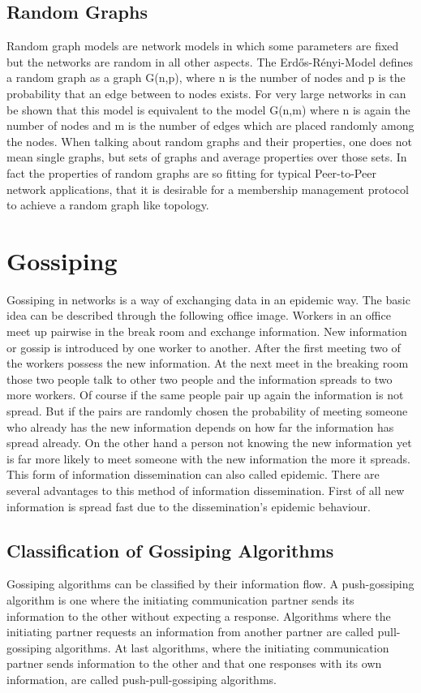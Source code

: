 \subsection{Random Graphs}
Random graph models are network models in which some parameters are fixed but
the networks are random in all other aspects. The Erd\H{o}s-R\'{e}nyi-Model
defines a random graph as a graph G(n,p), where n is the number of nodes and p
is the probability that an edge between to nodes exists. For very large networks
in can be shown that this model is equivalent to the model G(n,m) where n is
again the number of nodes and m is the number of edges which are placed randomly
among the nodes. When talking about random graphs and their properties, one does
not mean single graphs, but sets of graphs and average properties over those
sets. In fact the properties of random graphs are so fitting for typical
Peer-to-Peer network applications, that it is desirable for a membership
management protocol to achieve a random graph like topology.
% 




\section{Gossiping}
Gossiping in networks is a way of exchanging data in an epidemic way. The basic
idea can be described through the following office image. Workers in an office
meet up pairwise in the break room and exchange information. New information or
gossip is introduced by one worker to another. After the first meeting two of
the workers possess the new information. At the next meet in the breaking room those
two people talk to other two people and the information spreads to two more
workers. Of course if the same people pair up again the information is not
spread. But if the pairs are randomly chosen the probability of meeting someone
who already has the new information depends on how far the information has
spread already. On the other hand a person not knowing the new information yet
is far more likely to meet someone with the new information the more it spreads.
This form of information dissemination can also called epidemic. There are
several advantages to this method of information dissemination. First of all new
information is spread fast due to the dissemination's epidemic behaviour. 

\subsection{Classification of Gossiping Algorithms}
Gossiping algorithms can be classified by their information flow. A
push-gossiping algorithm is one where the initiating communication partner
sends its information to the other without expecting a response. Algorithms
where the initiating partner requests an information from another partner are
called pull-gossiping algorithms. At last algorithms, where the initiating
communication partner sends information to the other and that one responses with
its own information, are called push-pull-gossiping algorithms.


